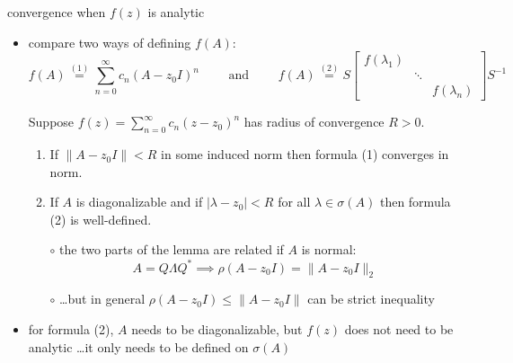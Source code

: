 \documentclass[10pt,hyperref]{beamer}
\begin{document}
\begin{frame}{convergence when $f(z)$ is analytic}

\begin{itemize}
\item compare two ways of defining $f(A)$:
\small
   $$f(A) \stackrel{(1)}{=} \sum_{n=0}^\infty c_n (A-z_0 I)^n \qquad \text{ and } \qquad f(A) \stackrel{(2)}{=} S \begin{bmatrix} f(\lambda_1) & & \\ & \ddots & \\ & & f(\lambda_n) \end{bmatrix} S^{-1}$$
\normalsize
\begin{lemma}
Suppose $f(z) = \sum_{n=0}^\infty c_n (z-z_0)^n$ has radius of convergence $R>0$.
    \begin{enumerate}
    \item If $\|A-z_0 I\|<R$ in some induced norm then formula (1) converges in norm.
    \item If $A$ is diagonalizable and if $|\lambda - z_0|<R$ for all $\lambda \in \sigma(A)$ then formula (2) is well-defined.
    \end{enumerate}
\end{lemma}
    \begin{itemize}
    \item[$\circ$] the two parts of the lemma are related if $A$ is normal:
    $$A = Q \Lambda Q^* \implies \rho(A-z_0 I) = \|A - z_0 I\|_2$$
    \item[$\circ$] \dots but in general $\rho(A-z_0 I) \le \|A-z_0 I\|$ can be strict inequality
    \end{itemize}
\item for formula (2), $A$ needs to be diagonalizable, but $f(z)$ does not need to be analytic \dots it only needs to be defined on $\sigma(A)$
\end{itemize}
\end{frame}
\end{document}
